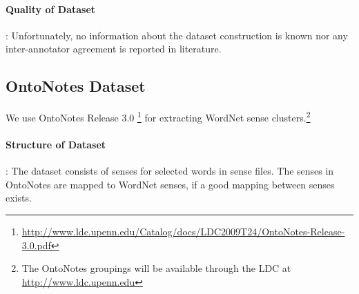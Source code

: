 \paragraph{Quality of Dataset}:
Unfortunately, no information about the dataset construction is known nor any inter-annotator agreement is reported in literature.

\subsection{OntoNotes Dataset}
\label{sec:OntoNotesDataset}
We use OntoNotes \citep{Hovy:2006} Release 3.0 \footnote{\url{http://www.ldc.upenn.edu/Catalog/docs/LDC2009T24/OntoNotes-Release-3.0.pdf}} for extracting WordNet sense clusters.\footnote{The OntoNotes groupings will be available through the LDC at \url{http://www.ldc.upenn.edu}} 

\paragraph{Structure of Dataset}: The dataset consists of senses for selected words in sense files. The senses in OntoNotes are mapped to WordNet senses, if a good mapping between senses exists.

